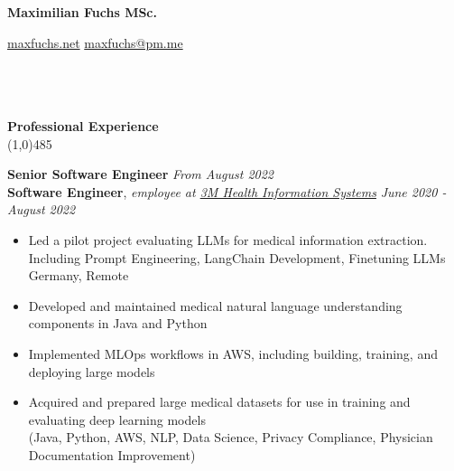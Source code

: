 \documentclass[9pt]{extarticle}
\newcommand\negativespace[1][-0.12cm]{\hspace*{#1}}
\begin{document}
\centerline{{\LARGE \bf Maximilian Fuchs MSc.}}
\centerline{\small \href{https://maxfuchs.net}{maxfuchs.net} \raisebox{0.25ex}{\tiny$\bullet$}  \href{mailto:maxfuchs@pm.me}{maxfuchs@pm.me}}


\noindent %
\\\\\\
\vspace*{-6pt}
{\negativespace \Large \bf Professional Experience}\\
\line(1,0){485}
\\
\noindent

\noindent
{\bf Senior Software Engineer}  \hfill \textit{From August 2022} \\
{\bf Software Engineer}, \textit{employee at \href{https://www.3m.com/3M/en_US/health-information-systems-us/support/international/}{3M Health Information Systems}}  \hfill \textit{June 2020 - August 2022} 
\begin{itemize}
\setlength\itemsep{0.05em}
\item Led a pilot project evaluating LLMs for medical information extraction. Including Prompt Engineering, LangChain Development, Finetuning LLMs \hfill Germany, Remote
\item Developed and maintained medical natural language understanding components in Java and Python
\item Implemented MLOps workflows in AWS, including building, training, and deploying large models
\item Acquired and prepared large medical datasets for use in training and evaluating deep learning models \\
(Java, Python, AWS, NLP, Data Science, Privacy Compliance, Physician Documentation Improvement) \\
\end{itemize}
\end{document}
